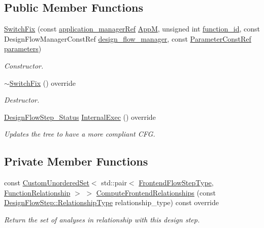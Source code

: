 \subsection*{Public Member Functions}
\begin{DoxyCompactItemize}
\item 
\hyperlink{classSwitchFix_a3acd195af1be04d4c834b5b542fcbf7d}{Switch\+Fix} (const \hyperlink{application__manager_8hpp_a04ccad4e5ee401e8934306672082c180}{application\+\_\+manager\+Ref} \hyperlink{classFrontendFlowStep_a0ac0d8db2a378416583f51c4faa59d15}{AppM}, unsigned int \hyperlink{classFunctionFrontendFlowStep_a58ef2383ad1a212a8d3f396625a4b616}{function\+\_\+id}, const Design\+Flow\+Manager\+Const\+Ref \hyperlink{classDesignFlowStep_ab770677ddf087613add30024e16a5554}{design\+\_\+flow\+\_\+manager}, const \hyperlink{Parameter_8hpp_a37841774a6fcb479b597fdf8955eb4ea}{Parameter\+Const\+Ref} \hyperlink{classDesignFlowStep_a802eaafe8013df706370679d1a436949}{parameters})
\begin{DoxyCompactList}\small\item\em Constructor. \end{DoxyCompactList}\item 
\hyperlink{classSwitchFix_a84d2ac06dd53537c0bf17b369f2e65f2}{$\sim$\+Switch\+Fix} () override
\begin{DoxyCompactList}\small\item\em Destructor. \end{DoxyCompactList}\item 
\hyperlink{design__flow__step_8hpp_afb1f0d73069c26076b8d31dbc8ebecdf}{Design\+Flow\+Step\+\_\+\+Status} \hyperlink{classSwitchFix_ab796548c62324fd3b26815dbf021cdfd}{Internal\+Exec} () override
\begin{DoxyCompactList}\small\item\em Updates the tree to have a more compliant C\+FG. \end{DoxyCompactList}\end{DoxyCompactItemize}
\subsection*{Private Member Functions}
\begin{DoxyCompactItemize}
\item 
const \hyperlink{classCustomUnorderedSet}{Custom\+Unordered\+Set}$<$ std\+::pair$<$ \hyperlink{frontend__flow__step_8hpp_afeb3716c693d2b2e4ed3e6d04c3b63bb}{Frontend\+Flow\+Step\+Type}, \hyperlink{classFrontendFlowStep_af7cf30f2023e5b99e637dc2058289ab0}{Function\+Relationship} $>$ $>$ \hyperlink{classSwitchFix_a7e25f29f6955c0a29ce90f345a3fcd08}{Compute\+Frontend\+Relationships} (const \hyperlink{classDesignFlowStep_a723a3baf19ff2ceb77bc13e099d0b1b7}{Design\+Flow\+Step\+::\+Relationship\+Type} relationship\+\_\+type) const override
\begin{DoxyCompactList}\small\item\em Return the set of analyses in relationship with this design step. \end{DoxyCompactList}\end{DoxyCompactItemize}
